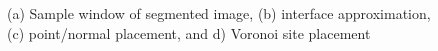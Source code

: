 \begin{figure}[ht]
{\label{fig:vor2}}
%
\caption{(a) Sample window of segmented image, (b) interface approximation, (c) point/normal placement, and d) Voronoi site placement}
\label{fig:vor}
\end{figure}

